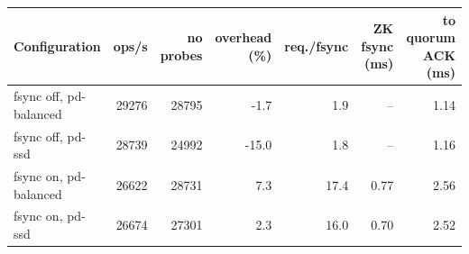 \begin{tabular}{@{}lrrrrrr@{}}
\toprule
Configuration & ops/s & no probes & overhead (\%) & req./fsync & ZK fsync (ms) & to quorum ACK (ms) \\
\midrule
fsync off, pd-balanced & 29276 & 28795 & -1.7 & 1.9 & -- & 1.14 \\
fsync off, pd-ssd & 28739 & 24992 & -15.0 & 1.8 & -- & 1.16 \\
fsync on, pd-balanced & 26622 & 28731 & 7.3 & 17.4 & 0.77 & 2.56 \\
fsync on, pd-ssd & 26674 & 27301 & 2.3 & 16.0 & 0.70 & 2.52 \\
\bottomrule
\end{tabular}
